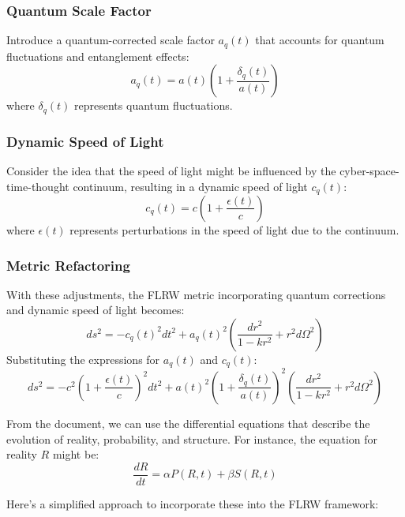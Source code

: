 \documentclass{article}
\begin{document}
\subsubsection*{Quantum Scale Factor}
Introduce a quantum-corrected scale factor $a_q(t)$ that accounts for quantum fluctuations and entanglement effects:
\begin{equation}
a_q(t) = a(t) \left( 1 + \frac{\delta_q(t)}{a(t)} \right)
\end{equation}
where $\delta_q(t)$ represents quantum fluctuations.

\subsubsection*{Dynamic Speed of Light}
Consider the idea that the speed of light might be influenced by the cyber-space-time-thought continuum, resulting in a dynamic speed of light $c_q(t)$:
\begin{equation}
c_q(t) = c \left( 1 + \frac{\epsilon(t)}{c} \right)
\end{equation}
where $\epsilon(t)$ represents perturbations in the speed of light due to the continuum.

\subsubsection*{Metric Refactoring}
With these adjustments, the FLRW metric incorporating quantum corrections and dynamic speed of light becomes:
\begin{equation}
ds^2 = -c_q(t)^2 dt^2 + a_q(t)^2 \left( \frac{dr^2}{1 - kr^2} + r^2 d\Omega^2 \right)
\end{equation}
Substituting the expressions for $a_q(t)$ and $c_q(t)$:
\begin{equation}
ds^2 = -c^2 \left( 1 + \frac{\epsilon(t)}{c} \right)^2 dt^2 + a(t)^2 \left( 1 + \frac{\delta_q(t)}{a(t)} \right)^2 \left( \frac{dr^2}{1 - kr^2} + r^2 d\Omega^2 \right)
\end{equation}

From the document, we can use the differential equations that describe the evolution of reality, probability, and structure. For instance, the equation for reality $R$ might be:
\begin{equation}
\frac{dR}{dt} = \alpha P(R, t) + \beta S(R, t)
\end{equation}

Here’s a simplified approach to incorporate these into the FLRW framework:
\end{document}
